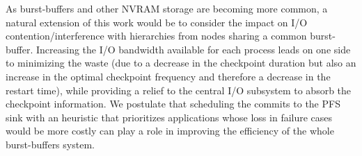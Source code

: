 As burst-buffers and other NVRAM storage are becoming more common, a natural
extension of this work would be to consider the impact on I/O
contention/interference with hierarchies from nodes sharing a common
burst-buffer. Increasing the I/O bandwidth available for each process leads on
one side to minimizing the waste (due to a decrease in the checkpoint duration
but also an increase in the optimal checkpoint frequency and therefore a
decrease in the restart time), while providing a relief to the central I/O
subsystem to absorb the checkpoint information. We postulate that scheduling the
commits to the PFS sink with an heuristic that prioritizes applications whose
loss in failure cases would be more costly can play a role in improving the
efficiency of the whole burst-buffers system.

